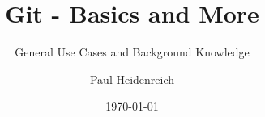 \titlehead{
	{\Large Munich}\\
	Germany\\
	Never up to date
}
\subject{
	Report
	\\
	\vspace{1.0cm}
	\texttt{[image: BavarianGitLogo]}
}
\title{Git - Basics and More}
\subtitle{General Use Cases and Background Knowledge}
\author{Paul Heidenreich}
\date{\today}
\maketitle